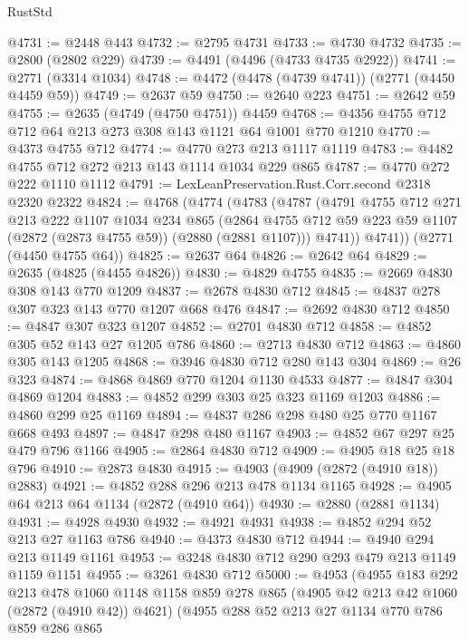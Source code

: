 \begin{lexlean}{RustStd}
\begin{coremodule}
@4731 := @2448 @443
@4732 := @2795 @4731
@4733 := @4730 @4732
@4735 := @2800 (@2802 @229)
@4739 := @4491 (@4496 (@4733 @4735 @2922))
@4741 := @2771 (@3314 @1034)
@4748 := @4472 (@4478 (@4739 @4741)) (@2771 (@4450 @4459 @59))
@4749 := @2637 @59
@4750 := @2640 @223
@4751 := @2642 @59
@4755 := @2635 (@4749 (@4750 @4751)) @4459
@4768 := @4356 @4755 @712 @712 @64 @213 @273 @308 @143 @1121 @64 @1001 @770 @1210
@4770 := @4373 @4755 @712
@4774 := @4770 @273 @213 @1117 @1119
@4783 := @4482 @4755 @712 @272 @213 @143 @1114 @1034 @229 @865
@4787 := @4770 @272 @222 @1110 @1112
@4791 := LexLeanPreservation.Rust.Corr.second @2318 @2320 @2322
@4824 := @4768
    (@4774
      (@4783
        (@4787
          (@4791
            @4755
            @712
            @271
            @213
            @222
            @1107
            @1034
            @234
            @865
            (@2864 @4755 @712 @59 @223 @59 @1107 (@2872 (@2873 @4755 @59)) (@2880 (@2881 @1107)))
            @4741))
        @4741))
    (@2771 (@4450 @4755 @64))
@4825 := @2637 @64
@4826 := @2642 @64
@4829 := @2635 (@4825 (@4455 @4826))
@4830 := @4829 @4755
@4835 := @2669 @4830 @308 @143 @770 @1209
@4837 := @2678 @4830 @712
@4845 := @4837 @278 @307 @323 @143 @770 @1207 @668 @476
@4847 := @2692 @4830 @712
@4850 := @4847 @307 @323 @1207
@4852 := @2701 @4830 @712
@4858 := @4852 @305 @52 @143 @27 @1205 @786
@4860 := @2713 @4830 @712
@4863 := @4860 @305 @143 @1205
@4868 := @3946 @4830 @712 @280 @143 @304
@4869 := @26 @323
@4874 := @4868 @4869 @770 @1204 @1130 @4533
@4877 := @4847 @304 @4869 @1204
@4883 := @4852 @299 @303 @25 @323 @1169 @1203
@4886 := @4860 @299 @25 @1169
@4894 := @4837 @286 @298 @480 @25 @770 @1167 @668 @493
@4897 := @4847 @298 @480 @1167
@4903 := @4852 @67 @297 @25 @479 @796 @1166
@4905 := @2864 @4830 @712
@4909 := @4905 @18 @25 @18 @796
@4910 := @2873 @4830
@4915 := @4903 (@4909 (@2872 (@4910 @18)) @2883)
@4921 := @4852 @288 @296 @213 @478 @1134 @1165
@4928 := @4905 @64 @213 @64 @1134 (@2872 (@4910 @64))
@4930 := @2880 (@2881 @1134)
@4931 := @4928 @4930
@4932 := @4921 @4931
@4938 := @4852 @294 @52 @213 @27 @1163 @786
@4940 := @4373 @4830 @712
@4944 := @4940 @294 @213 @1149 @1161
@4953 := @3248 @4830 @712 @290 @293 @479 @213 @1149 @1159 @1151
@4955 := @3261 @4830 @712
@5000 := @4953
    (@4955
      @183
      @292
      @213
      @478
      @1060
      @1148
      @1158
      @859
      @278
      @865
      (@4905 @42 @213 @42 @1060 (@2872 (@4910 @42)) @4621)
      (@4955
        @288
        @52
        @213
        @27
        @1134
        @770
        @786
        @859
        @286
        @865

\end{coremodule}
\end{lexlean}
